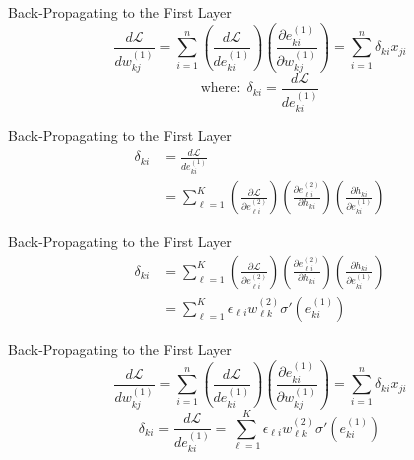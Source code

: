 \documentclass{beamer}
\begin{document}
\begin{frame}
  \begin{small}\end{small}
  \begin{block}{Back-Propagating to the First Layer}    
    \[
    \frac{d{\mathcal L}}{d w_{kj}^{(1)}} =
    \sum_{i=1}^n
    \left(\frac{d{\mathcal L}}{de_{ki}^{(1)}}\right)
    \left(\frac{\partial e_{ki}^{(1)}}{\partial w_{kj}^{(1)}}\right)
    = \sum_{i=1}^n \delta_{ki}x_{ji}
    \]
    \[
    \mbox{where:}~~\delta_{ki}=\frac{d{\mathcal L}}{de_{ki}^{(1)}}
    \]
  \end{block}
\end{frame}

\begin{frame}
  \begin{small}\end{small}
  \begin{block}{Back-Propagating to the First Layer}    
    \begin{align*}
      \delta_{ki} &=\frac{d{\mathcal L}}{de_{ki}^{(1)}}\\
      &= \sum_{\ell=1}^K
      \left(\frac{\partial{\mathcal L}}{\partial e_{\ell i}^{(2)}}\right)
      \left(\frac{\partial e_{\ell i}^{(2)}}{\partial h_{ki}}\right)
      \left(\frac{\partial h_{ki}}{\partial e_{ki}^{(1)}}\right)
    \end{align*}
  \end{block}
\end{frame}

\begin{frame}
  \begin{small}\end{small}
  \begin{block}{Back-Propagating to the First Layer}    
    \begin{align*}
      \delta_{ki} 
      &= \sum_{\ell=1}^K
      \left(\frac{\partial{\mathcal L}}{\partial e_{\ell i}^{(2)}}\right)
      \left(\frac{\partial e_{\ell i}^{(2)}}{\partial h_{ki}}\right)
      \left(\frac{\partial h_{ki}}{\partial e_{ki}^{(1)}}\right)\\
      &= \sum_{\ell=1}^K \epsilon_{\ell i}w_{\ell k}^{(2)}\sigma'(e_{ki}^{(1)})
    \end{align*}
  \end{block}
\end{frame}

\begin{frame}
  \begin{small}\end{small}
  \begin{block}{Back-Propagating to the First Layer}    
    \[
    \frac{d{\mathcal L}}{d w_{kj}^{(1)}} =
    \sum_{i=1}^n
    \left(\frac{d{\mathcal L}}{de_{ki}^{(1)}}\right)
    \left(\frac{\partial e_{ki}^{(1)}}{\partial w_{kj}^{(1)}}\right)
    = \sum_{i=1}^n \delta_{ki}x_{ji}
    \]
    \[
    \delta_{ki}=\frac{d{\mathcal L}}{de_{ki}^{(1)}}=
    \sum_{\ell=1}^K \epsilon_{\ell i}w_{\ell k}^{(2)}\sigma'(e_{ki}^{(1)})
    \]
  \end{block}
\end{frame}
\end{document}
